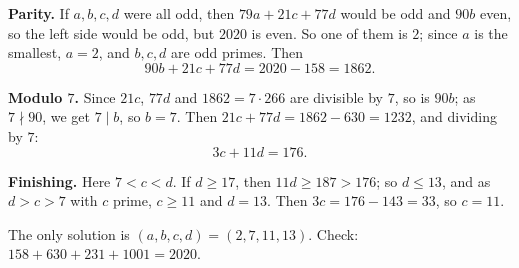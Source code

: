 \textbf{Parity.} If $a,b,c,d$ were all odd, then $79a+21c+77d$ would be odd and $90b$ even, so the left side would be odd, but $2020$ is even. So one of them is $2$; since $a$ is the smallest, $a=2$, and $b,c,d$ are odd primes. Then
\[90b+21c+77d=2020-158=1862 .\]

\textbf{Modulo $7$.} Since $21c$, $77d$ and $1862=7\cdot266$ are divisible by $7$, so is $90b$; as $7\nmid90$, we get $7\mid b$, so $b=7$. Then $21c+77d=1862-630=1232$, and dividing by $7$:
\[3c+11d=176 .\]

\textbf{Finishing.} Here $7<c<d$. If $d\ge17$, then $11d\ge187>176$; so $d\le13$, and as $d>c>7$ with $c$ prime, $c\ge11$ and $d=13$. Then $3c=176-143=33$, so $c=11$.

The only solution is $\boxed{(a,b,c,d)=(2,7,11,13)}$. Check: $158+630+231+1001=2020$.
